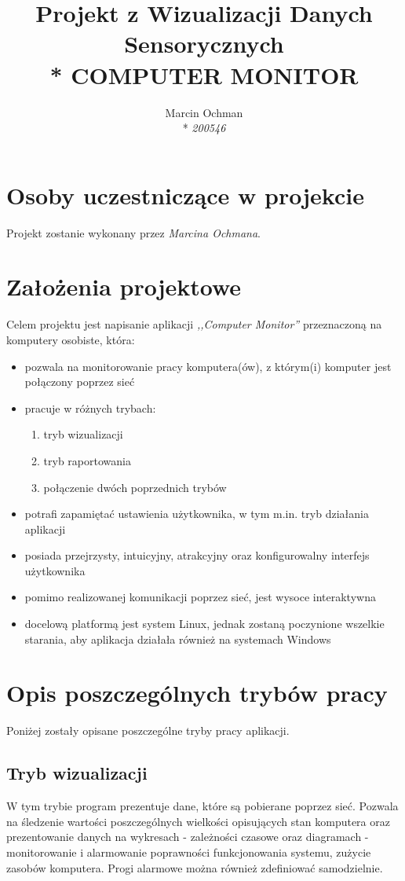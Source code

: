 \documentclass[a4paper]{article}
\author{Marcin Ochman \\* \textit{200546}}
\title{ Projekt z Wizualizacji Danych Sensorycznych \\* 
	\huge{\uppercase{\textbf{Computer Monitor}}}}
\date{}
\begin{document}
	\maketitle
	
	\section{Osoby uczestniczące w projekcie}
		Projekt zostanie wykonany przez \textit{Marcina Ochmana}.
		
	\section{Założenia projektowe}
	Celem projektu jest napisanie aplikacji \textit{,,Computer Monitor''} przeznaczoną na komputery osobiste, która:
	\begin{itemize}
		\item pozwala na monitorowanie pracy komputera(ów), z którym(i) komputer jest połączony poprzez sieć
		\item pracuje w różnych trybach:
		\begin{enumerate}
			\item tryb wizualizacji
			\item tryb raportowania
			\item połączenie dwóch poprzednich trybów
		\end{enumerate}
		\item potrafi zapamiętać ustawienia użytkownika, w tym m.in. tryb działania aplikacji
		\item posiada przejrzysty, intuicyjny, atrakcyjny oraz konfigurowalny interfejs użytkownika
		\item pomimo realizowanej komunikacji poprzez sieć, jest wysoce 
		interaktywna
		\item docelową platformą jest system Linux, jednak zostaną poczynione wszelkie starania, aby aplikacja działała również na systemach Windows
	\end{itemize}
	
	\section{Opis poszczególnych trybów pracy}
	Poniżej zostały opisane poszczególne tryby pracy aplikacji.
	
	\subsection{Tryb wizualizacji}
		W tym trybie program prezentuje dane, które są pobierane poprzez sieć. Pozwala na śledzenie wartości poszczególnych wielkości opisujących stan komputera oraz prezentowanie danych na wykresach - zależności czasowe oraz diagramach - monitorowanie i alarmowanie poprawności funkcjonowania systemu, zużycie zasobów komputera. Progi alarmowe można również zdefiniować samodzielnie.
	
\end{document}
